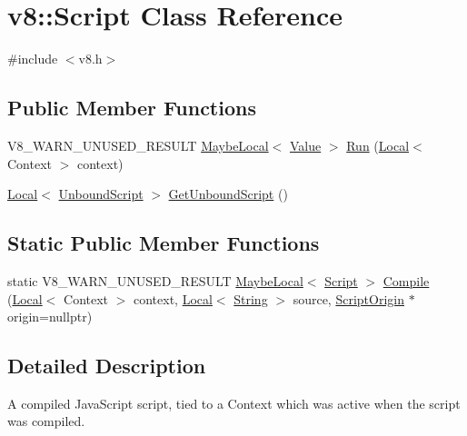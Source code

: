 \hypertarget{classv8_1_1Script}{}\section{v8\+:\+:Script Class Reference}
\label{classv8_1_1Script}


{\ttfamily \#include $<$v8.\+h$>$}

\subsection*{Public Member Functions}
\begin{DoxyCompactItemize}
\item 
V8\+\_\+\+W\+A\+R\+N\+\_\+\+U\+N\+U\+S\+E\+D\+\_\+\+R\+E\+S\+U\+LT \mbox{\hyperlink{classv8_1_1MaybeLocal}{Maybe\+Local}}$<$ \mbox{\hyperlink{classv8_1_1Value}{Value}} $>$ \mbox{\hyperlink{classv8_1_1Script_a37cfd598569f8b502d568a8a7a5a319b}{Run}} (\mbox{\hyperlink{classv8_1_1Local}{Local}}$<$ Context $>$ context)
\item 
\mbox{\hyperlink{classv8_1_1Local}{Local}}$<$ \mbox{\hyperlink{classv8_1_1UnboundScript}{Unbound\+Script}} $>$ \mbox{\hyperlink{classv8_1_1Script_afac25cad452a61897c375c2b881e2070}{Get\+Unbound\+Script}} ()
\end{DoxyCompactItemize}
\subsection*{Static Public Member Functions}
\begin{DoxyCompactItemize}
\item 
static V8\+\_\+\+W\+A\+R\+N\+\_\+\+U\+N\+U\+S\+E\+D\+\_\+\+R\+E\+S\+U\+LT \mbox{\hyperlink{classv8_1_1MaybeLocal}{Maybe\+Local}}$<$ \mbox{\hyperlink{classv8_1_1Script}{Script}} $>$ \mbox{\hyperlink{classv8_1_1Script_a1793e3022a87f5a574df10bff8b42762}{Compile}} (\mbox{\hyperlink{classv8_1_1Local}{Local}}$<$ Context $>$ context, \mbox{\hyperlink{classv8_1_1Local}{Local}}$<$ \mbox{\hyperlink{classv8_1_1String}{String}} $>$ source, \mbox{\hyperlink{classv8_1_1ScriptOrigin}{Script\+Origin}} $\ast$origin=nullptr)
\end{DoxyCompactItemize}


\subsection{Detailed Description}
A compiled Java\+Script script, tied to a Context which was active when the script was compiled. 

